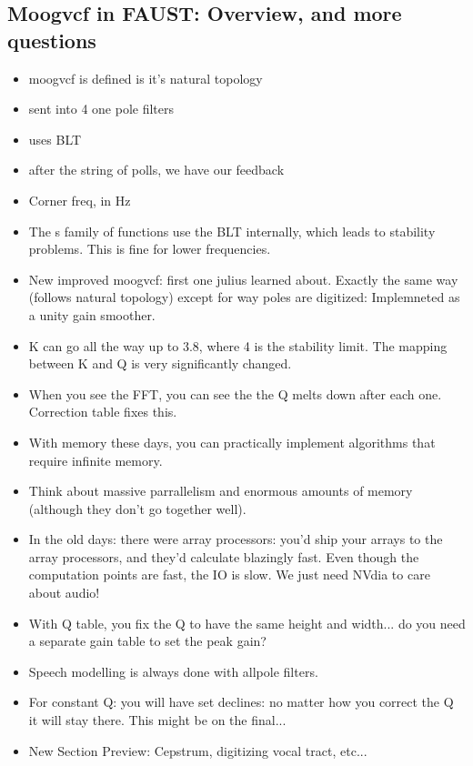 \subsection*{Moogvcf in FAUST: Overview, and more questions}
\begin{itemize}
\item{
moogvcf is defined is it's natural topology
}
\item{ 
sent into 4 one pole filters
}
\item{
uses BLT
}
\item{
after the string of polls, we have our feedback
}
\item{
Corner freq, in Hz
}
\item{
The s family of functions use the BLT internally, which leads 
to stability problems. This is fine for lower frequencies. 
}
\item{
New improved moogvcf: first one julius learned about. Exactly the same way (follows natural topology)
except for way poles are digitized: Implemneted as a unity gain smoother. 
}
\item{
K can go all the way up to 3.8, where 4 is the stability limit. The mapping between K and Q is 
very significantly changed.
}
\item{
When you see the FFT, you can see the the Q melts down after each one. Correction table
fixes this. 
}
\item{
With memory these days, you can practically implement algorithms that require infinite memory. 
}
\item{
Think about massive parrallelism and enormous amounts of memory 
(although they don't go together well). 
}
\item{
In the old days: there were array processors: you'd ship your arrays to the array processors, 
and they'd calculate blazingly fast. Even though the computation points are fast, the IO is slow.
We just need NVdia to care about audio! 
}
\item{
With Q table, you fix the Q to have the same height and width... do you need a separate
gain table to set the peak gain? 
}
\item{
Speech modelling is always done with allpole filters. 
}
\item{
For constant Q: you will have set declines: no matter how you correct the Q it will stay there.
This might be on the final...
}
\item{
New Section Preview: Cepstrum, digitizing vocal tract, etc...
}
\end{itemize}

